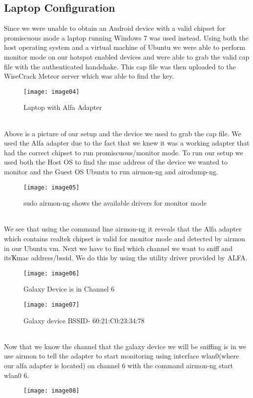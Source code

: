\documentclass[12pt, titlepage]{article}
\begin{document}
\subsection{Laptop Configuration}
Since we were unable to obtain an Android device with a valid chipset for promiscuous mode a laptop running Windows 7 was used instead.  Using both the host operating system and a virtual machine of Ubuntu we were able to perform monitor mode on our hotspot enabled devices and were able to grab the valid cap file with the authenticated handshake.  This cap file was then uploaded to the WiseCrack Meteor server which was able to find the key.  
\\
\begin{figure}[hb]
\centering
\texttt{[image: image04]}
\caption{Laptop with Alfa Adapter}
\end{figure}
\\
Above is a picture of our setup and the device we used to grab the cap file.  We used the Alfa adapter due to the fact that we knew it was a working adapter that had the correct chipset to run promiscuous/monitor mode.  To run our setup we used both the Host OS to find the mac address of the device we wanted to monitor and the Guest OS Ubuntu to run airmon-ng and airodump-ng. 
\\
\begin{figure}[h]
\centering
\texttt{[image: image05]}
\caption{sudo airmon-ng shows the available drivers for monitor mode}
\end{figure}
\\
We see that using the command line airmon-ng it reveals that the Alfa adapter which contains realtek chipset is valid for monitor mode and detected by airmon in our Ubuntu vm.  Next we have to find which channel we want to sniff and itsҠmac address/bssid.  We do this by using the utility driver provided by ALFA.
\\
\begin{figure}[h]
\centering
\texttt{[image: image06]}
\caption{Galaxy Device is in Channel 6}
\end{figure}

\newpage

\begin{figure}[h]
\centering
\texttt{[image: image07]}
\caption{Galaxy device BSSID- 60:21:C0:23:34:78}
\end{figure}
\\
Now that we know the channel that the galaxy device we will be sniffing is in we use airmon to tell the adapter to start monitoring using interface wlan0(where our alfa adapter is located) on channel 6 with the command airmon-ng start wlan0 6.
\\
\begin{figure}[h]
\centering
\texttt{[image: image08]}
\end{figure}
\end{document}
